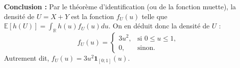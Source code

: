 {\begin{enumerate}
{			\textbf{Conclusion :}
			Par le théorème d'identification (ou de la fonction muette), la densité de $U = X+Y$ est la fonction $f_U(u)$ telle que $\mathbb{E}[h(U)] = \int_{\mathbb{R}} h(u) f_U(u) du$.
			On en déduit donc la densité de $U$ :
			\[
			f_U(u) =
			\begin{cases}
				3u^2, & \text{si } 0 \leq u \leq 1, \\
				0, & \text{sinon}.
			\end{cases}
			\]
			Autrement dit, $f_U(u)=3u^2\mathbf{1}_{[0;1]}(u)$.
		}
	\end{enumerate}
}